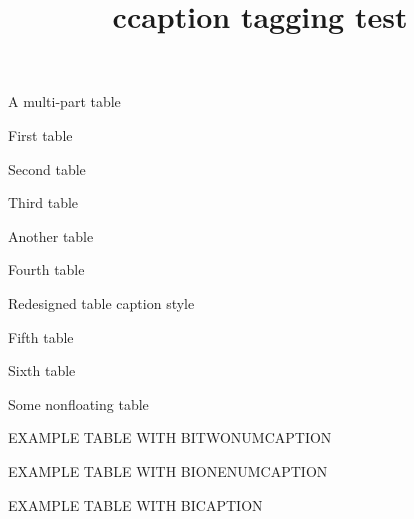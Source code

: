 \documentclass{article}
\title{ccaption tagging test}
\begin{document}
\listoftables
\listofdiagram %

\begin{table}
\centering
\caption{A multi-part table} \label{tab:m}
First table
\end{table}

\begin{table}
\centering
{}
Second table
\end{table}

\begin{table}
\centering
{}
Third table
\end{table}

\begin{table}
\centering
\caption{Another table} \label{tab:legend}
Fourth table
\end{table}

\begin{table}
\centering
\captionnamefont{\sffamily}
\captiondelim{}
\captionstyle{\\}
\captiontitlefont{\scshape}
\setlength{\belowcaptionskip}{10pt}
\caption{Redesigned table caption style} \label{tab:style}
Fifth table
\end{table}

\begin{table}
\centering
\captionnamefont{\sffamily}
\captiontitlefont{\itshape}
Sixth table
\end{table}

\begin{center}
Some nonfloating table
\end{center}

\begin{table}
\centering
EXAMPLE TABLE WITH BITWONUMCAPTION
\end{table}

\begin{table}
\centering
EXAMPLE TABLE WITH BIONENUMCAPTION
\end{table}

\begin{table}
\centering
EXAMPLE TABLE WITH BICAPTION
\end{table}
\end{document}
